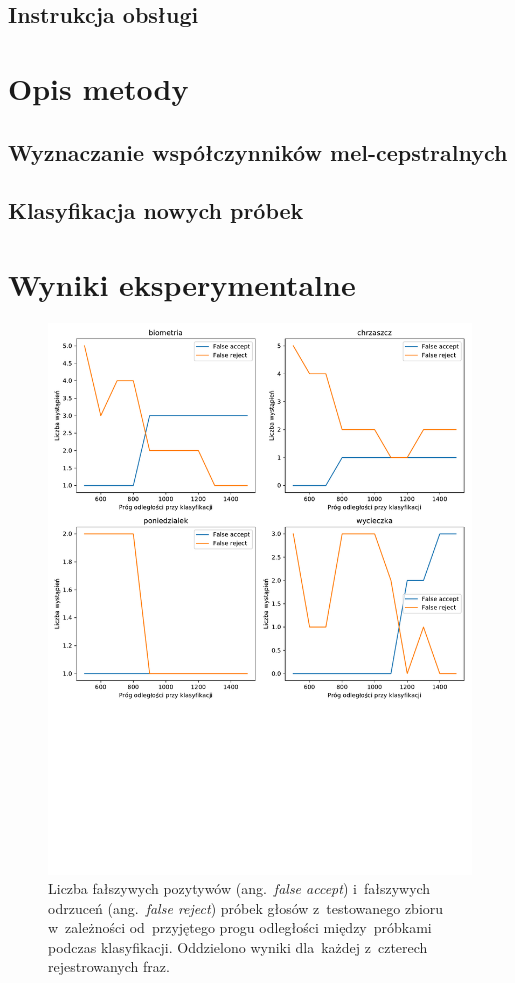 \documentclass[11pt,a4paper]{article}
\begin{document}
\subsection{Instrukcja obsługi}

\section{Opis metody}

\subsection{Wyznaczanie współczynników mel-cepstralnych}

\subsection{Klasyfikacja nowych próbek}

\section{Wyniki eksperymentalne}

\begin{figure}
    \centering
    \includegraphics[width=\textwidth]{res/plots/acceptance_rates.pdf}
    \caption{Liczba fałszywych pozytywów (ang.~\emph{false accept}) i~fałszywych odrzuceń (ang.~\emph{false reject}) próbek głosów z~testowanego zbioru w~zależności od~przyjętego progu odległości między~próbkami podczas klasyfikacji.
    Oddzielono wyniki dla~każdej z~czterech rejestrowanych fraz.}
    \label{fig:acceptance-rates}
\end{figure}
\end{document}

